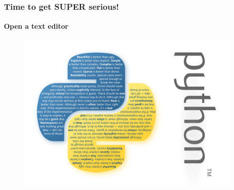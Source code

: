 \documentclass{beamer}
\begin{document}
\begin{frame}
\frametitle{Time to get SUPER serious!}
\framesubtitle{Open a text editor}
\vspace{-1cm}
\begin{figure}
 \includegraphics[scale=0.45, clip = true, trim = 0mm  0mm 10cm 0mm]{zen-of-python-poster.pdf}\end{figure}
\end{frame}
\end{document}
